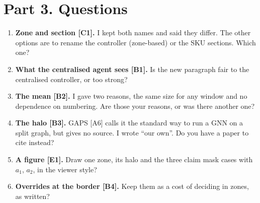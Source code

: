 \documentclass[11pt,a4paper]{article}
\begin{document}
\section*{Part 3. Questions}
\begin{enumerate}
  \item \textbf{Zone and section [C1].} I kept both names and said they
        differ. The other options are to rename the controller
        (zone-based) or the SKU sections. Which one?
  \item \textbf{What the centralised agent sees [B1].} Is the new
        paragraph fair to the centralised controller, or too strong?
  \item \textbf{The mean [B2].} I gave two reasons, the same size for any
        window and no dependence on numbering. Are those your reasons, or
        was there another one?
  \item \textbf{The halo [B3].} GAPS [A6] calls it the standard way to run a
        GNN on a split graph, but gives no source. I wrote ``our own''. Do
        you have a paper to cite instead?
  \item \textbf{A figure [E1].} Draw one zone, its halo and the three
        claim mask cases with $a_1$, $a_2$, in the viewer style?
  \item \textbf{Overrides at the border [B4].} Keep them as a cost of
        deciding in zones, as written?
\end{enumerate}
\end{document}

